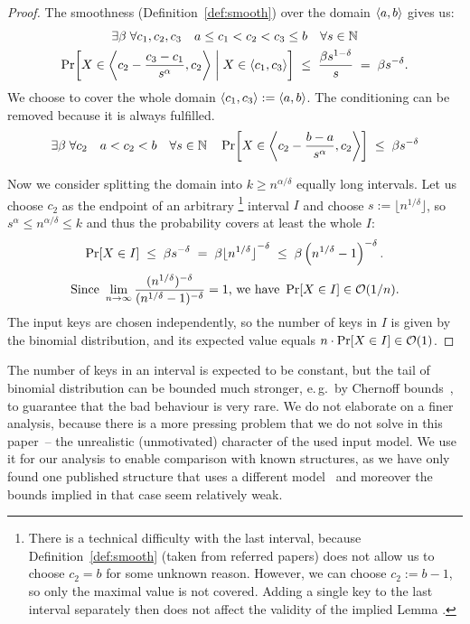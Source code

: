 

\begin{proof}

The smoothness (Definition~\ref{def:smooth}) over the domain $\left\langle a,b\right\rangle$ gives us:
\begin{multline*}
	\exists\beta \; \forall c_1,c_2,c_3 \quad a \le c_1 < c_2 < c_3 \le b \quad \forall s \in \mathbb{N} \\
		\Pr\!\left[  X \in \left\langle c_2 - \frac{c_3-c_1}{s^\alpha} ,c_2\right\rangle \; \middle| \; X \in \left\langle c_1,c_3\right\rangle  \right]
		\;\le\; \frac{\beta s^{1-\delta}}{s}  \;=\;  \beta s^{-\delta}.
\end{multline*}
We choose to cover the whole domain $\left\langle c_1,c_3\right\rangle := \left\langle a,b\right\rangle$. The conditioning can be removed because it is always fulfilled.
\[
	\exists\beta \; \forall c_2 \quad a < c_2 < b \quad \forall s \in \mathbb{N} \quad
		\Pr\!\left[  X \in \left\langle c_2 - \frac{b-a}{s^\alpha} ,c_2\right\rangle  \right]
		\;\le\; \beta s^{-\delta}
\]

Now we consider splitting the domain into $k \ge n^{\alpha / \delta}$ equally long intervals.
Let us choose $c_2$ as the endpoint of an arbitrary%
	\footnote{There is a technical difficulty with the last interval, because Definition~\ref{def:smooth} (taken from referred papers) does not allow us to choose $c_2 = b$ for some unknown reason.
	However, we can choose $c_2 := b-1$, so only the maximal value is not covered. Adding a single key to the last interval separately then does not affect the validity of the implied Lemma%
	.
	}
interval $I$ and choose $s:= \lfloor n^{1 / \delta} \rfloor$, so
$ s^\alpha \le n^{\alpha / \delta} \le k $ and thus the probability covers at least the whole $I$:
\[	\Pr\!\left[X \in I\right] \;\le\; \beta s^{-\delta}
	\;=\; \beta {\lfloor n^{1 / \delta} \rfloor}^{-\delta}
	\;\le\; \beta \left( n^{1 / \delta} - 1 \right) ^{-\delta}.
\] \[
\text{Since } \lim_{n \to \infty}
	\frac{ ( n^{1 / \delta} ) ^{-\delta} }{ ( n^{1 / \delta} - 1 ) ^{-\delta} }
	= 1 \text{, we have } \Pr\!\left[X \in I\right] \in \mathcal O(1/n).
\]
%
The input keys are chosen independently, so the number of keys in $I$ is given by the binomial distribution, and its expected value equals
$ n \cdot \Pr\!\left[X \in I\right] \in \mathcal O(1)$.

\end{proof}

The number of keys in an interval is expected to be constant, but the tail of binomial distribution can be bounded much stronger, e.\,g.~by Chernoff bounds~\cite[chapter~4.1]{randomAlgs}, to guarantee that the bad behaviour is very rare.
We do not elaborate on a finer analysis, because there is a more pressing problem that we do not solve in this paper~-- the unrealistic (unmotivated) character of the used input model.
We use it for our analysis to enable comparison with known structures, as we have only found one published structure that uses a different model~\cite{DemaineJP04} and moreover the bounds implied in that case seem relatively weak. %



